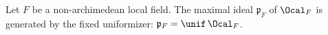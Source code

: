 Let $F$ be a non-archimedean local field. The maximal ideal $\mathfrak p_F$ of $\Ocal_F$ is generated by the fixed uniformizer: $\mathfrak p_F=\unif\,\Ocal_F$.
